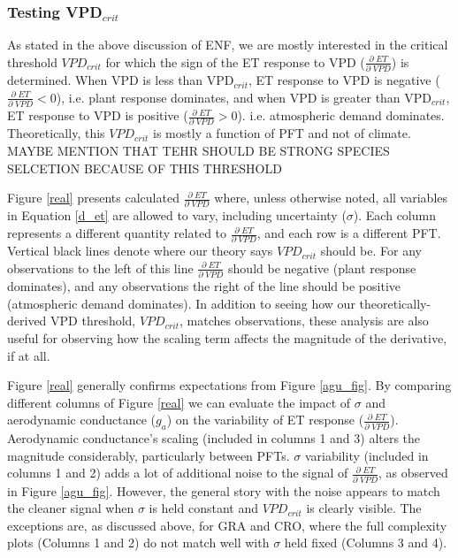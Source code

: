 \documentclass[draft,linenumbers]{agujournal}
\begin{document}
\subsubsection{Testing VPD$_{crit}$}
As stated in the above discussion of ENF, we are mostly interested in the critical threshold $VPD_{crit}$ for which the sign of the ET response to VPD ($\frac{\partial \; ET}{\partial \; VPD}$) is determined. When VPD is less than VPD$_{crit}$, ET response to VPD is negative ($\frac{\partial \; ET}{\partial \; VPD}  < 0$), i.e. plant response dominates, and when VPD is greater than VPD$_{crit}$, ET response to VPD is positive  ($\frac{\partial \; ET}{\partial \; VPD} > 0$). i.e. atmospheric demand dominates. Theoretically, this $VPD_{crit}$ is mostly a function of PFT and not of climate. MAYBE MENTION THAT TEHR SHOULD BE STRONG SPECIES SELCETION BECAUSE OF THIS THRESHOLD

Figure \ref{real} presents calculated $\frac{\partial \; ET}{\partial \; VPD}$ where, unless otherwise noted, all variables in Equation \ref{d_et} are allowed to vary, including uncertainty ($\sigma$). Each column represents a different quantity related to $\frac{\partial \; ET}{\partial \; VPD}$, and each row is a different PFT. Vertical black lines denote where our theory says $VPD_{crit}$ should be. For any observations to the left of this line $\frac{\partial \; ET}{\partial \; VPD}$ should be negative (plant response dominates), and any observations the right of the line should be positive (atmospheric demand dominates). In addition to seeing how our theoretically-derived VPD threshold, $VPD_{crit}$, matches observations, these analysis are also useful for observing how the scaling term affects the magnitude of the derivative, if at all. 

Figure \ref{real} generally confirms expectations from Figure \ref{agu_fig}. By comparing different columns of Figure \ref{real} we can evaluate the impact of $\sigma$ and aerodynamic conductance ($g_a$) on the variability of ET response ($\frac{\partial \; ET}{\partial \; VPD}$). Aerodynamic conductance's scaling (included in columns 1 and 3) alters the magnitude considerably, particularly between PFTs. $\sigma$ variability (included in columns 1 and 2) adds a lot of additional noise to the signal of $\frac{\partial \; ET}{\partial \; VPD}$, as observed in Figure \ref{agu_fig}. However, the general story with the noise appears to match the cleaner signal when $\sigma$ is held constant and $VPD_{crit}$ is clearly visible. The exceptions are, as discussed above, for GRA and CRO, where the full complexity plots (Columns 1 and 2) do not match well with $\sigma$ held fixed (Columns 3 and 4).
\end{document}
